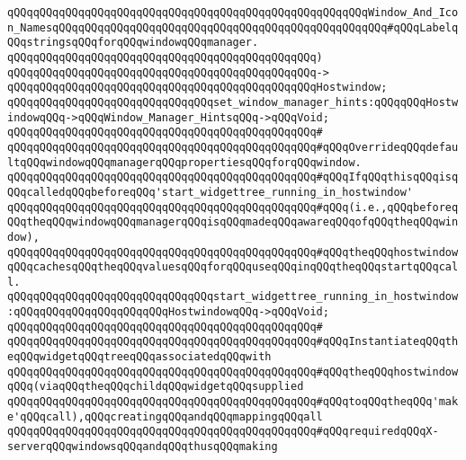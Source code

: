 \verb|qQQqqQQqqQQqqQQqqQQqqQQqqQQqqQQqqQQqqQQqqQQqqQQqqQQqqQQqWindow_And_Icon_NamesqQQqqQQqqQQqqQQqqQQqqQQqqQQqqQQqqQQqqQQqqQQqqQQqqQQq#qQQqLabelqQQqstringsqQQqforqQQqwindowqQQqmanager.|\newline
\verb|qQQqqQQqqQQqqQQqqQQqqQQqqQQqqQQqqQQqqQQqqQQqqQQq)|\newline
\verb|qQQqqQQqqQQqqQQqqQQqqQQqqQQqqQQqqQQqqQQqqQQqqQQq->|\newline
\verb|qQQqqQQqqQQqqQQqqQQqqQQqqQQqqQQqqQQqqQQqqQQqqQQqHostwindow;|\newline
\newline
\verb|qQQqqQQqqQQqqQQqqQQqqQQqqQQqqQQqset_window_manager_hints:qQQqqQQqHostwindowqQQq->qQQqWindow_Manager_HintsqQQq->qQQqVoid;|\newline
\verb|qQQqqQQqqQQqqQQqqQQqqQQqqQQqqQQqqQQqqQQqqQQqqQQq#|\newline
\verb|qQQqqQQqqQQqqQQqqQQqqQQqqQQqqQQqqQQqqQQqqQQqqQQq#qQQqOverrideqQQqdefaultqQQqwindowqQQqmanagerqQQqpropertiesqQQqforqQQqwindow.|\newline
\verb|qQQqqQQqqQQqqQQqqQQqqQQqqQQqqQQqqQQqqQQqqQQqqQQq#qQQqIfqQQqthisqQQqisqQQqcalledqQQqbeforeqQQq'start_widgettree_running_in_hostwindow'|\newline
\verb|qQQqqQQqqQQqqQQqqQQqqQQqqQQqqQQqqQQqqQQqqQQqqQQq#qQQq(i.e.,qQQqbeforeqQQqtheqQQqwindowqQQqmanagerqQQqisqQQqmadeqQQqawareqQQqofqQQqtheqQQqwindow),|\newline
\verb|qQQqqQQqqQQqqQQqqQQqqQQqqQQqqQQqqQQqqQQqqQQqqQQq#qQQqtheqQQqhostwindowqQQqcachesqQQqtheqQQqvaluesqQQqforqQQquseqQQqinqQQqtheqQQqstartqQQqcall.|\newline
\newline
\verb|qQQqqQQqqQQqqQQqqQQqqQQqqQQqqQQqstart_widgettree_running_in_hostwindow:qQQqqQQqqQQqqQQqqQQqqQQqHostwindowqQQq->qQQqVoid;|\newline
\verb|qQQqqQQqqQQqqQQqqQQqqQQqqQQqqQQqqQQqqQQqqQQqqQQq#|\newline
\verb|qQQqqQQqqQQqqQQqqQQqqQQqqQQqqQQqqQQqqQQqqQQqqQQq#qQQqInstantiateqQQqtheqQQqwidgetqQQqtreeqQQqassociatedqQQqwith|\newline
\verb|qQQqqQQqqQQqqQQqqQQqqQQqqQQqqQQqqQQqqQQqqQQqqQQq#qQQqtheqQQqhostwindowqQQq(viaqQQqtheqQQqchildqQQqwidgetqQQqsupplied|\newline
\verb|qQQqqQQqqQQqqQQqqQQqqQQqqQQqqQQqqQQqqQQqqQQqqQQq#qQQqtoqQQqtheqQQq'make'qQQqcall),qQQqcreatingqQQqandqQQqmappingqQQqall|\newline
\verb|qQQqqQQqqQQqqQQqqQQqqQQqqQQqqQQqqQQqqQQqqQQqqQQq#qQQqrequiredqQQqX-serverqQQqwindowsqQQqandqQQqthusqQQqmaking|\newline
